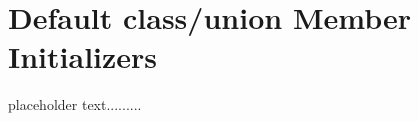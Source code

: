 \newpage
\section[Default Member Init]{Default {\SecCode class}/{\SecCode union} Member Initializers}\label{Default-Member-Initializers}


placeholder text.........


